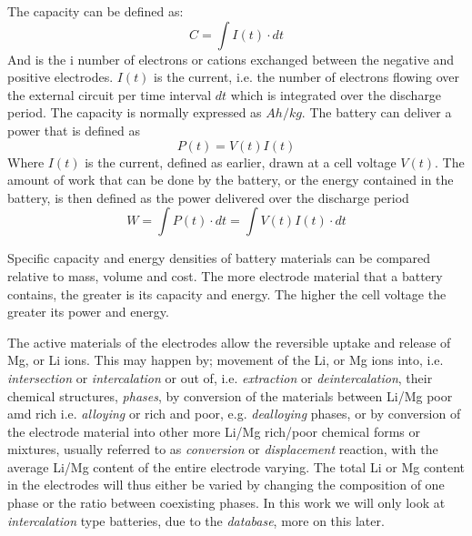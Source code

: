 	
	The capacity can be defined as:
	\begin{equation}
	C = \int I(t)\cdot dt
	\end{equation}
	And is the i number of electrons or cations exchanged between the negative and positive electrodes. $I(t)$ is the current, i.e. the number of electrons flowing over the external circuit per time interval $dt$ which is integrated over the discharge period. The capacity is normally expressed as $\si{Ah/kg}$. The battery can deliver a power that is defined as
	\begin{equation}
	P(t)=V(t)I(t)
	\end{equation}
	Where $I(t)$ is the current, defined as earlier, drawn at a cell voltage $V(t)$. The amount of work that can be done by the battery, or the energy contained in the battery, is then defined as the power delivered over the discharge period
	\begin{equation}
	W = \int P(t) \cdot dt = \int V(t)I(t) \cdot dt
	\end{equation}
	
	Specific capacity and energy densities of battery materials can be compared relative to mass, volume and cost. The more electrode material that a battery contains, the greater is its capacity and energy. The higher the cell voltage the greater its power and energy. 
	
	The active materials of the electrodes allow the reversible uptake and release of Mg, or Li ions. This may happen by; movement of the Li, or Mg ions into, i.e. \textit{intersection} or \textit{intercalation} or out of, i.e. \textit{extraction} or \textit{deintercalation}, their chemical structures, \textit{phases}, by conversion of the materials between Li/Mg poor amd rich i.e. \textit{alloying} or rich and poor, e.g. \textit{dealloying} phases, or by conversion of the electrode material into other more Li/Mg rich/poor chemical forms or mixtures, usually referred to as \textit{conversion} or \textit{displacement} reaction, with the average Li/Mg content of the entire electrode varying. 
	The total Li or Mg content in the electrodes will thus either be varied by changing the composition of one phase or the ratio between coexisting phases. In this work we will only look at \textit{intercalation} type batteries, due to the \textit{database}, more on this later.	
	
	
	
